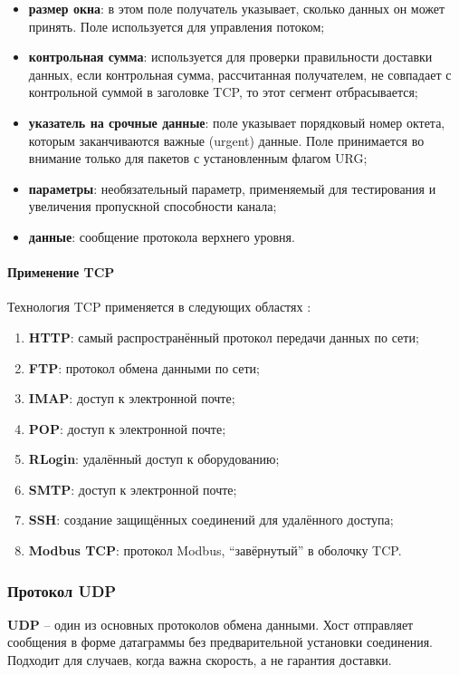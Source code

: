 \begin{itemize}
	\item \textbf{размер окна}:  в этом поле получатель указывает, сколько данных он может принять. Поле используется для управления потоком;
	\item \textbf{контрольная сумма}: используется для проверки правильности доставки данных, если контрольная сумма, рассчитанная получателем, не совпадает с контрольной суммой в заголовке TCP, то этот сегмент отбрасывается;
	\item \textbf{указатель на срочные данные}: поле указывает порядковый номер октета, которым заканчиваются важные (urgent) данные. Поле принимается во внимание только для пакетов с установленным флагом URG;
	\item \textbf{параметры}: необязательный параметр, применяемый для тестирования и увеличения пропускной способности канала;
	\item \textbf{данные}: сообщение протокола верхнего уровня.
\end{itemize}

\paragraph{Применение TCP}
Технология TCP применяется в следующих областях \cite{kumar_survey_2012}:
\begin{enumerate}
	\item \textbf{HTTP}: самый распространённый протокол передачи данных по сети;
	\item \textbf{FTP}: протокол обмена данными по сети; 
	\item \textbf{IMAP}: доступ к электронной почте;
	\item \textbf{POP}: доступ к электронной почте;
	\item \textbf{RLogin}: удалённый доступ к оборудованию;
	\item \textbf{SMTP}: доступ к электронной почте;
	\item \textbf{SSH}: создание защищённых соединений для удалённого доступа;
	\item \textbf{Modbus TCP}: протокол Modbus, ``завёрнутый'' в оболочку TCP.
\end{enumerate}

\subsubsection{Протокол UDP}
\textbf{UDP} \cite{kumar_survey_2012} -- один из основных протоколов обмена данными. Хост отправляет сообщения в форме датаграммы без предварительной установки соединения. Подходит для случаев, когда важна скорость, а не гарантия доставки. 

